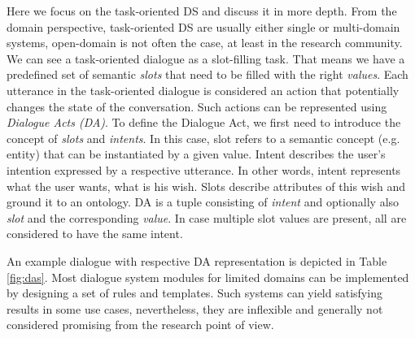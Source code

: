 Here we focus on the task-oriented DS and discuss it in more depth.
From the domain perspective, task-oriented DS are usually either single or multi-domain systems, open-domain is not often the case, at least in the research community.
We can see a task-oriented dialogue as a slot-filling task.
That means we have a predefined set of semantic \textit{slots} that need to be filled with the right \textit{values}.
Each utterance in the task-oriented dialogue is considered an action that potentially changes the state of the conversation.
Such actions can be represented using \textit{Dialogue Acts (DA)}\cite{core1997coding}.
To define the Dialogue Act, we first need to introduce the concept of \emph{slots} and \emph{intents}.
In this case, slot refers to a semantic concept (e.g. entity) that can be instantiated by a given value.
Intent describes the user's intention expressed by a respective utterance.
In other words, intent represents what the user wants, what is his wish.
Slots describe attributes of this wish and ground it to an ontology.
DA is a tuple consisting of \textit{intent} and optionally also \textit{slot} and the corresponding \textit{value}.
In case multiple slot values are present, all are considered to have the same intent.

An example dialogue with respective DA representation is depicted in Table \ref{fig:das}.
Most dialogue system modules for limited domains can be implemented by designing a set of rules and templates.
Such systems can yield satisfying results in some use cases, nevertheless, they are inflexible and generally not considered promising from the research point of view.

